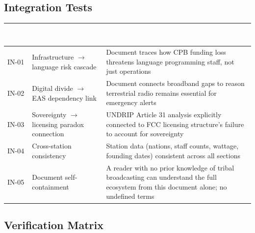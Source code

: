 \documentclass[11pt,letterpaper]{article}
\newcommand{\tableheader}[1]{\textbf{\sffamily\textcolor{white}{#1}}}
\begin{document}
\subsection{Integration Tests}

\begin{center}
\begin{tabularx}{\textwidth}{C{1.2cm}L{4cm}X}
\toprule
{}
\tableheader{Test ID} & \tableheader{Verifies} & \tableheader{Expected Behavior} \\
\midrule
IN-01 & Infrastructure $\rightarrow$ language risk cascade & Document traces how CPB funding loss threatens language programming staff, not just operations \\
IN-02 & Digital divide $\rightarrow$ EAS dependency link & Document connects broadband gaps to reason terrestrial radio remains essential for emergency alerts \\
IN-03 & Sovereignty $\rightarrow$ licensing paradox connection & UNDRIP Article 31 analysis explicitly connected to FCC licensing structure's failure to account for sovereignty \\
IN-04 & Cross-station consistency & Station data (nations, staff counts, wattage, founding dates) consistent across all sections \\
IN-05 & Document self-containment & A reader with no prior knowledge of tribal broadcasting can understand the full ecosystem from this document alone; no undefined terms \\
\bottomrule
\end{tabularx}
\end{center}

\subsection{Verification Matrix}
\end{document}
